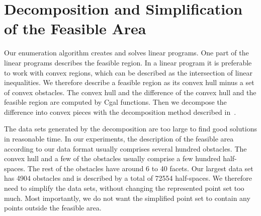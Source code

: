 \documentclass{article}
\newcommand\ignore[1]{}
\newcounter{algo}
\newcommand{\cgal}{{\sc Cgal}}
\begin{document}
\ignore{
In {\cgal}, the feasible area $F$ can be easily extracted from the
union of the facets' Minkowski sums. However, the Minkowski sum is a
very complex operation. In the three-dimensional space, this operation
has complexity $O(n^6)$, where $n$ is the combined complexity of $P$
and $Q$. With the introduced method, the computation of the feasible
area of a trunk takes very long.  In our experiments, we used three
trunk models. The computation of a feasible area of the models took
between 35 and 69 minutes.

To speed up the computation of the feasible area we experimented with
several heuristics. All of these heuristics were based on the same
idea. First, we quickly compute a super-set $S_F$ of the feasible area
$F$, then we subtract each Minkowski sum of the suitcase and a facet
of the trunk that has an intersection with $S_F$. As an example, we
obtained $S_F$ as the solid induced by the convex hull of the
trunk. The heuristics reduced the computation of a feasible area to
clearly less than 10 minutes, but none of them was reliable. For the
correctness it is crucial that $S_F$ is a subset of $B\cup F$, but for
complex trunk models we could not guarantee this property. What we are
missing at this point is a method to remove the holes in the trunk's
surfaces. With a closed surface, we can model the trunks exterior as a
solid and obtain a good approximation of the feasible area by merging
several translated copies of the solid. Unfortunately, the problem of
removing the holes in a surface is astoundingly complex.
}

\section{Decomposition and Simplification of the Feasible Area}
\label{sec:simplification}

Our enumeration algorithm creates and solves linear programs. One part
of the linear programs describes the feasible region. In a linear
program it is preferable to work with convex regions, which can be
described as the intersection of linear inequalities. We therefore
describe a feasible region as its convex hull minus a set of convex
obstacles. The convex hull and the difference of the convex hull and
the feasible region are computed by {\cgal} functions. Then we
decompose the difference into convex pieces with the decomposition
method described in~\cite{h-emspe-07}.

The data sets generated by the decomposition are too large to find
good solutions in reasonable time. In our experiments, the description
of the feasible area according to our data format usually comprises
several hundred obstacles. The convex hull and a few of the obstacles
usually comprise a few hundred half-spaces. The rest of the obstacles
have around 6 to 40 facets. Our largest data set has 4904 obstacles
and is described by a total of 72554 half-spaces. We therefore need to
simplify the data sets, without changing the represented point set too
much. Most importantly, we do not want the simplified point set to
contain any points outside the feasible area.
\end{document}
